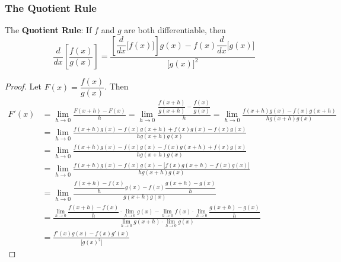 \subsubsection*{The Quotient Rule}
The \textbf{Quotient Rule}: If \(f\) and \(g\) are both differentiable, then
\[\frac{d}{dx}\left[\frac{f(x)}{g(x)}\right]
=\frac{\left[\dfrac{d}{dx}\big[f(x)\big]\right]g(x)
-f(x)\dfrac{d}{dx}\big[g(x)\big]}{\big[g(x)\big]^2}\]
\begin{proof}
    Let \(F(x)=\dfrac{f(x)}{g(x)}\).
    Then
    \allowdisplaybreaks
    \begin{align*}
        F'(x) 
        &= \lim_{h\to 0}\frac{F(x+h)-F(x)}{h}
        =\lim_{h\to 0}\frac{\dfrac{f(x+h)}{g(x+h)}-\dfrac{f(x)}{g(x)}}{h}
        =\lim_{h\to 0}\frac{f(x+h)g(x)-f(x)g(x+h)}{hg(x+h)g(x)} \\
        &= \lim_{h\to 0}
        \frac{f(x+h)g(x)-f(x)g(x+h)+f(x)g(x)-f(x)g(x)}{hg(x+h)g(x)} \\
        &= \lim_{h\to 0}
        \frac{f(x+h)g(x)-f(x)g(x)-f(x)g(x+h)+f(x)g(x)}{hg(x+h)g(x)} \\
        &= \lim_{h\to 0}
        \frac{f(x+h)g(x)-f(x)g(x)
        -\big[f(x)g(x+h)-f(x)g(x)\big]}{hg(x+h)g(x)} \\
        &= \lim_{h\to 0}
        \frac{\dfrac{f(x+h)-f(x)}{h}g(x)
        -f(x)\dfrac{g(x+h)-g(x)}{h}}{g(x+h)g(x)} \\
        &= {\frac{\displaystyle{\lim_{h\to 0}}
        \dfrac{f(x+h)-f(x)}{h}\cdot\displaystyle{\lim_{h\to 0}}g(x)
        -\displaystyle{\lim_{h\to 0}}f(x)\cdot\displaystyle{\lim_{h\to 0}}
        \dfrac{g(x+h)-g(x)}{h}}{\displaystyle{\lim_{h\to 0}}g(x+h)
        \cdot\displaystyle{\lim_{h\to 0}}g(x)}} \\
        &= \frac{f'(x)g(x)-f(x)g'(x)}{\big[g(x)^2\big]}
    \end{align*}
\end{proof}

